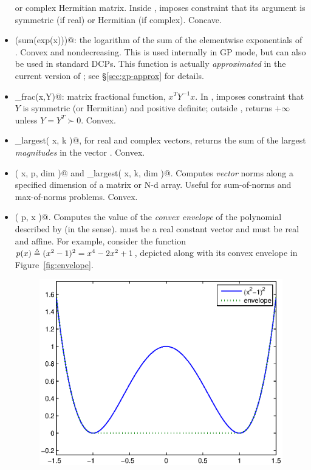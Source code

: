 \documentclass[12pt]{article}
\begin{document}
\begin{itemize}
or complex Hermitian matrix.
Inside \cvx, imposes constraint that its argument 
is symmetric (if real) or Hermitian (if complex).
Concave.
\item \verb@log(sum(exp(x)))@: the
logarithm of the sum of the elementwise exponentials of \verb@x@.
Convex and nondecreasing.
This is used internally in GP mode, but can also be used in standard
DCPs. This function is actually \emph{approximated} in the
current version of \cvx; see \S\ref{sec:gp-approx} for details.
\item \verb@matrix_frac(x,Y)@: matrix fractional function,
$x^TY^{-1}x$.  In \cvx, imposes constraint that $Y$ is 
symmetric (or Hermitian) and positive definite; outside \cvx,
returns $+\infty$ unless $Y=Y^T\succ 0$.
Convex. 
\item \verb@norm_largest( x, k )@, for real and complex vectors,
returns the sum of the largest \verb@k@ \emph{magnitudes} in the
vector \verb@x@.
Convex.
\item \verb@norms( x, p, dim )@ and \verb@norms_largest( x, k, dim )@.
Computes \emph{vector} norms along a specified dimension of a matrix
or N-d array. Useful for sum-of-norms and max-of-norms problems.
Convex.
\item \verb@polyenv( p, x )@. 
Computes the value of the \emph{convex envelope} of the polynomial
described by \verb@p@ (in the \verb@polyval@ sense). \verb@p@ must be
a real constant vector and \verb@x@ must be real and affine.
For example, consider the function $p(x)\triangleq (x^2-1)^2=x^4-2x^2+1$,
depicted along with its convex envelope in Figure~\ref{fig:envelope}.
\begin{figure}
\begin{center}
\includegraphics[width=4.5in]{envelope.eps}

\end{center}
\end{figure}
\end{itemize}
\end{document}
